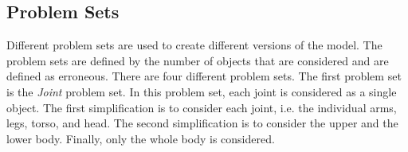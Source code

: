 \subsection{Problem Sets}
\label{sec:problem_set}

Different problem sets are used to create different versions of the model. The problem sets are defined by the number of objects that are considered and are defined as erroneous. There are four different problem sets. The first problem set is the \textit{Joint} problem set. In this problem set, each joint is considered as a single object. The first simplification is to consider each joint, i.e. the individual arms, legs, torso, and head. The second simplification is to consider the upper and the lower body. Finally, only the whole body is considered.
